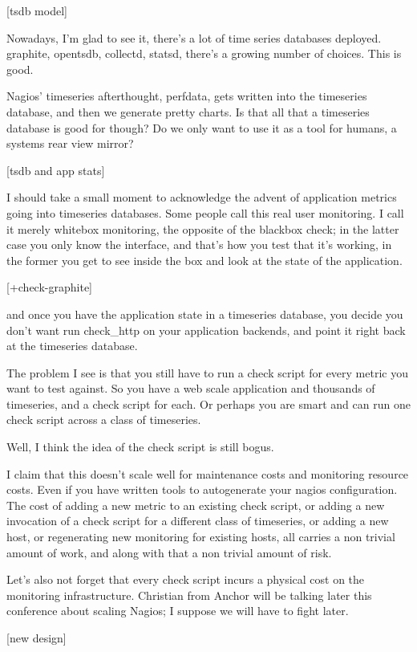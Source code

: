 \documentclass[online,12pt,helvetica]{chaksem}
\begin{document}
[tsdb model]

Nowadays, I'm glad to see it, there's a lot of time series databases deployed.
graphite, opentsdb, collectd, statsd, there's a growing number of choices.
This is good.

Nagios' timeseries afterthought, perfdata, gets written into the timeseries
database, and then we generate pretty charts.  Is that all that a timeseries
database is good for though?  Do we only want to use it as a tool for humans,
a systems rear view mirror?

[tsdb and app stats]

I should take a small moment to acknowledge the advent of application metrics
going into timeseries databases.  Some people call this real user monitoring.
I call it merely whitebox monitoring, the opposite of the blackbox check; in
the latter case you only know the interface, and that's how you test that it's
working, in the former you get to see inside the box and look at the state of
the application.

[+check-graphite]

and once you have the application state in a timeseries database, you decide
you don't want run check\_http on your application backends, and point it right
back at the timeseries database.

The problem I see is that you still have to run a check script for every metric
you want to test against.  So you have a web scale application and thousands of
timeseries, and a check script for each.  Or perhaps you are smart and can run
one check script across a class of timeseries.

Well, I think the idea of the check script is still bogus.

I claim that this doesn't scale well for maintenance costs and monitoring
resource costs.  Even if you have written tools to autogenerate your nagios
configuration.  The cost of adding a new metric to an existing check script, or
adding a new invocation of a check script for a different class of timeseries,
or adding a new host, or regenerating new monitoring for existing hosts, all
carries a non trivial amount of work, and along with that a non trivial amount
of risk.

Let's also not forget that every check script incurs a physical cost on the
monitoring infrastructure.  Christian from Anchor will be talking later this
conference about scaling Nagios; I suppose we will have to fight later.


[new design]
\end{document}
